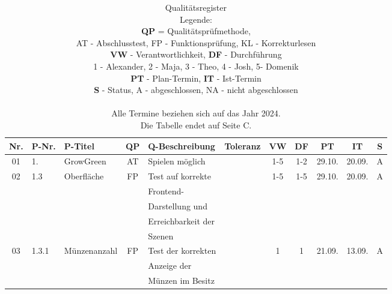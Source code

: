 \label{ch:anhang}
\footnotesize


\begin{longtable}{|c|l|l|c|l|l|c|c|c|c|c|}
    \caption[Qualitätsregister]{Qualitätsregister \\ Legende: \\
            \textbf{QP} = Qualitätsprüfmethode, \\
            AT - Abschlusstest, FP - Funktionsprüfung, KL - Korrekturlesen \\
            \textbf{VW} - Verantwortlichkeit, \textbf{DF} - Durchführung\\
            1 - Alexander, 2 - Maja, 3 - Theo, 4 - Josh, 5- Domenik \\
            \textbf{PT} - Plan-Termin, \textbf{IT} - Ist-Termin\\
            \textbf{S} - Status, A - abgeschlossen, NA - nicht abgeschlossen \\\\
            Alle Termine beziehen sich auf das Jahr 2024.\\
            Die Tabelle endet auf Seite C.\\}
    \label{tab:quality}\\
            \hline
            Nr. & P-Nr. & P-Titel & QP & Q-Beschreibung & Toleranz & VW & DF & PT & IT & S \\[0.5ex]
            \hline\hline
            01 & 1. & GrowGreen & AT & Spielen möglich & & 1-5 & 1-2 & 29.10. & 20.09. & A \\
            \hline
            02 & 1.3 & Oberfläche & FP & Test auf korrekte &  & 1-5 & 1-5 & 29.10. & 20.09. & A \\
               &       &            &    & Frontend- &   &   & & & &\\
               &       &            &    & Darstellung und &   &   & & & &\\
               &       &            &    & Erreichbarkeit der &   &   & & & &\\
               &       &            &    & Szenen &   &   & & & &\\
            \hline
            03 & 1.3.1 & Münzenanzahl & FP & Test der korrekten &  & 1 & 1 & 21.09. & 13.09. & A \\
            &       &            &    & Anzeige der &   &   & & & &\\
            &       &            &    & Münzen im Besitz &   &   & & & &\\
            \hline

\end{longtable}
